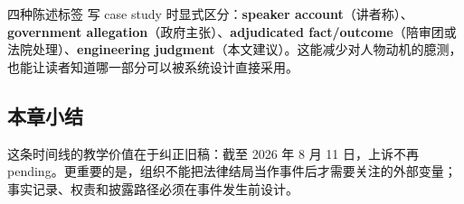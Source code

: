 \begin{importantbox}{四种陈述标签}
写 case study 时显式区分：\textbf{speaker account}（讲者称）、\textbf{government allegation}（政府主张）、\textbf{adjudicated fact/outcome}（陪审团或法院处理）、\textbf{engineering judgment}（本文建议）。这能减少对人物动机的臆测，也能让读者知道哪一部分可以被系统设计直接采用。
\end{importantbox}

\subsection{本章小结}

这条时间线的教学价值在于纠正旧稿：截至 2026 年 8 月 11 日，上诉不再 pending。更重要的是，组织不能把法律结局当作事件后才需要关注的外部变量；事实记录、权责和披露路径必须在事件发生前设计。

